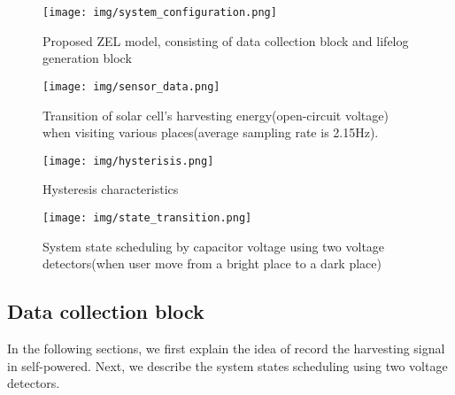 \documentclass[conference]{IEEEtran}
\begin{document}
\begin{figure}[bt]
    \centering
    \texttt{[image: img/system\_configuration.png]}
    \caption{Proposed ZEL model, consisting of data collection block and lifelog generation block}
    \label{fig:system_configuration}
\end{figure}
\begin{figure}[bt]
    \centering
    \texttt{[image: img/sensor\_data.png]}
    \caption{Transition of solar cell's harvesting energy(open-circuit voltage) when visiting various places(average sampling rate is 2.15Hz).}
    \label{fig:voltage_sensor_data}
\end{figure}
\begin{figure}[bt]
    \centering
    \texttt{[image: img/hysterisis.png]}
    \caption{Hysteresis characteristics}
    \label{fig:hysterisis}
\end{figure}
\begin{figure*}[bt]
    \centering
    \texttt{[image: img/state\_transition.png]}
     \caption{System state scheduling by capacitor voltage using two voltage detectors(when user move from a bright place to a dark place)}
    \label{fig:device_flow}
\end{figure*}
\subsection{Data collection block}
In the following sections, we first explain the idea of record the harvesting signal in self-powered.
Next, we describe the system states scheduling using two voltage detectors.
\end{document}
